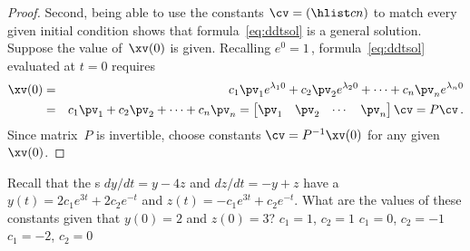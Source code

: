 \begin{proof}
\begin{comment}
Straightforward substitution is simpler, but the above reinforces the simplification through diagonalization.
\end{comment}

Second, being able to use the constants \(\cv=(\hlist cn)\) to match every given initial condition shows that formula~\eqref{eq:ddtsol} is a general solution.
Suppose the value of~\(\xv(0)\) is given.
Recalling \(e^0=1\)\,, formula~\eqref{eq:ddtsol} evaluated at \(t=0\)  requires
\begin{eqnarray*}
\xv(0)&=&c_1\pv_1e^{\lambda_10}+c_2\pv_2e^{\lambda_20}+\cdots+c_n\pv_ne^{\lambda_n0}
\\&=&c_1\pv_1+c_2\pv_2+\cdots+c_n\pv_n
=\begin{bmatrix} \pv_1&\pv_2&\cdots&\pv_n \end{bmatrix}\cv
=P\cv\,.
\end{eqnarray*}
Since matrix~\(P\) is invertible, choose constants \(\cv=P^{-1}\xv(0)\) for any given~\(\xv(0)\).
\end{proof}





\begin{activity}
Recall that the s \(dy/dt=y-4z\) and \(dz/dt=-y+z\) have a  \(y(t)=2c_1e^{3t}+2c_2e^{-t}\) and \(z(t)=-c_1e^{3t}+c_2e^{-t}\).
What are the values of these constants given that \(y(0)=2\) and \(z(0)=3\)?
{\(c_1=1\), \(c_2=1\)}
{\(c_1=0\), \(c_2=-1\)}
{\(c_1=-2\), \(c_2=0\)}
\end{activity}




